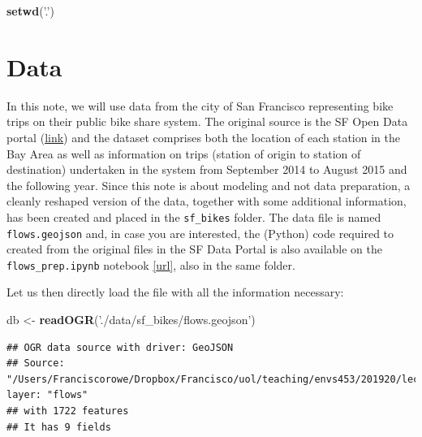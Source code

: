 \documentclass[]{book}
\newenvironment{Shaded}{\begin{snugshade}}{\end{snugshade}}
\newcommand{\KeywordTok}[1]{\textcolor[rgb]{0.13,0.29,0.53}{\textbf{#1}}}
\newcommand{\StringTok}[1]{\textcolor[rgb]{0.31,0.60,0.02}{#1}}
\newcommand{\OtherTok}[1]{\textcolor[rgb]{0.56,0.35,0.01}{#1}}
\newcommand{\OperatorTok}[1]{\textcolor[rgb]{0.81,0.36,0.00}{\textbf{#1}}}
\newcommand{\NormalTok}[1]{#1}
\begin{document}
\begin{Shaded}
\begin{Highlighting}[]
\KeywordTok{setwd}\NormalTok{(}\StringTok{'.'}\NormalTok{)}
\end{Highlighting}
\end{Shaded}

\section{Data}\label{data-1}

In this note, we will use data from the city of San Francisco
representing bike trips on their public bike share system. The original
source is the SF Open Data portal
(\href{http://www.bayareabikeshare.com/open-data}{link}) and the dataset
comprises both the location of each station in the Bay Area as well as
information on trips (station of origin to station of destination)
undertaken in the system from September 2014 to August 2015 and the
following year. Since this note is about modeling and not data
preparation, a cleanly reshaped version of the data, together with some
additional information, has been created and placed in the
\texttt{sf\_bikes} folder. The data file is named \texttt{flows.geojson}
and, in case you are interested, the (Python) code required to created
from the original files in the SF Data Portal is also available on the
\texttt{flows\_prep.ipynb} notebook
\href{https://github.com/darribas/spa_notes/blob/master/sf_bikes/flows_prep.ipynb}{{[}url{]}},
also in the same folder.

Let us then directly load the file with all the information necessary:

\begin{Shaded}
\begin{Highlighting}[]
\NormalTok{db <-}\StringTok{ }\KeywordTok{readOGR}\NormalTok{(}\StringTok{'./data/sf_bikes/flows.geojson'}\NormalTok{)}
\end{Highlighting}
\end{Shaded}

\begin{verbatim}
## OGR data source with driver: GeoJSON 
## Source: "/Users/Franciscorowe/Dropbox/Francisco/uol/teaching/envs453/201920/lectures/san/data/sf_bikes/flows.geojson", layer: "flows"
## with 1722 features
## It has 9 fields
\end{verbatim}

\begin{Shaded}
\end{Shaded}
\end{document}
